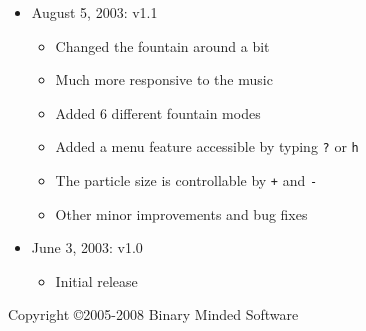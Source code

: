 \documentclass[11pt]{article}
\begin{document}
\begin{itemize}
\item August 5, 2003: v1.1
\begin{itemize}
\item Changed the fountain around a bit 
\item Much more responsive to the music 
\item Added 6 different fountain modes 
\item Added a menu feature accessible by typing \verb'?' or \verb'h' 
\item The particle size is controllable by \verb'+' and \verb'-' 
\item Other minor improvements and bug fixes 
\end{itemize}

\item June 3, 2003: v1.0
\begin{itemize}
\item Initial release
\end{itemize}
\end{itemize}

\begin{center}
    Copyright \copyright 2005-2008 Binary Minded Software
\end{center}
\end{document}
